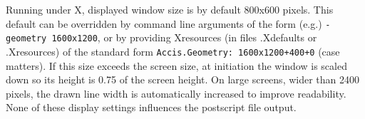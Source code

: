 \documentclass[12pt]{article}
\begin{document}
Running under X, displayed window size is by default 800x600
pixels. This default can be overridden by command line arguments of
the form (e.g.)  \verb!-geometry 1600x1200!, or by providing
Xresources (in files .Xdefaults or .Xresources) of the standard form
\verb!Accis.Geometry: 1600x1200+400+0! (case matters). If this size
exceeds the screen size, at initiation the window is scaled down so
its height is 0.75 of the screen height.  On large screens, wider than
2400 pixels, the drawn line width is automatically increased to
improve readability. None of these display settings influences the
postscript file output.
\end{document}
